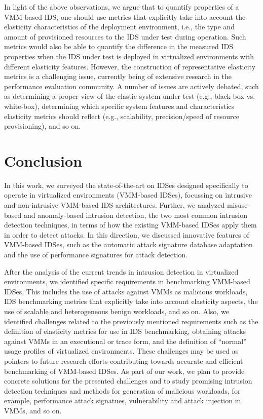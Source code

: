 In light of the above observations, we argue that to quantify properties of a VMM-based IDS, one should use metrics that explicitly take into account the elasticity characteristics of the deployment environment, i.e., the type and amount of provisioned resources to the IDS under test during operation. Such metrics would also be able to quantify the difference in the measured IDS properties when the IDS under test is deployed in virtualized environments with different elasticity features. However, the construction of representative elasticity metrics is a challenging issue, currently being of extensive research in the performance evaluation community. A number of issues are actively debated, such as determining a proper view of the elastic system under test (e.g., black-box vs. white-box), determining which specific system features and characteristics elasticity metrics should reflect (e.g., scalability, precision/speed of resource provisioning), and so on.

\section{Conclusion}
\label{sec:conclusion}

In this work, we surveyed the state-of-the-art on IDSes designed specifically to operate in virtualized environments (VMM-based IDSes), focussing on intrusive and non-intrusive VMM-based IDS architectures. Further, we analyzed misuse-based and anomaly-based intrusion detection, the two most common intrusion detection techniques, in terms of how the existing VMM-based IDSes apply them in order to detect attacks. In this direction, we discussed innovative features of VMM-based IDSes, such as the automatic attack signature database adaptation and the use of performance signatures for attack detection. 

After the analysis of the current trends in intrusion detection in virtualized environments, we identified specific requirements in benchmarking VMM-based IDSes. This includes the use of attacks against VMMs as malicious workloads, IDS benchmarking metrics that explicitly take into account elasticity aspects, the use of scalable and heterogeneous benign workloads, and so on. Also, we identified challenges related to the previously mentioned requirements such as the definition of elasticity metrics for use in IDS benchmarking, obtaining attacks against VMMs in an executional or trace form, and the definition of ``normal'' usage profiles of virtualized environments. These challenges may be used as pointers to future research efforts contributing towards accurate and efficient benchmarking of VMM-based IDSes. As part of our work, we plan to provide concrete solutions for the presented challenges and to study promising intrusion detection techniques and methods for generation of malicious workloads, for example, performance attack signatues, vulnerability and attack injection in VMMs, and so on.












